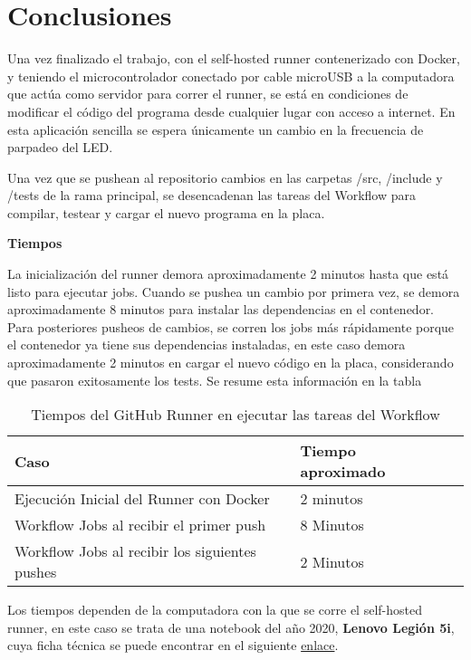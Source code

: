 \chapter{Conclusiones}\label{cap:conclusiones}
Una vez finalizado el trabajo, con el self-hosted runner contenerizado con Docker, y teniendo el microcontrolador conectado por cable microUSB a la computadora que actúa como servidor para correr el runner, se está en condiciones de modificar el código del programa desde cualquier lugar con acceso a internet. En esta aplicación sencilla se espera únicamente un cambio en la frecuencia de parpadeo del LED.

Una vez que se pushean al repositorio cambios en las carpetas /src, /include y /tests de la rama principal, se desencadenan las tareas del Workflow para compilar, testear y cargar el nuevo programa en la placa.

\textbf{Tiempos}

La inicialización del runner demora aproximadamente 2 minutos hasta que está listo para ejecutar jobs.
Cuando se pushea un cambio por primera vez, se demora aproximadamente 8 minutos para instalar las dependencias en el contenedor. Para posteriores pusheos de cambios, se corren los jobs más rápidamente porque el contenedor ya tiene sus dependencias instaladas, en este caso demora aproximadamente 2 minutos en cargar el nuevo código en la placa, considerando que pasaron exitosamente los tests. Se resume esta información en la tabla

\begin{table}[H]
\begin{center}
\begin{tabular}{lll}
\hline
\multicolumn{1}{|l|}{\textbf{Caso}} & \multicolumn{1}{l|}{\textbf{Tiempo aproximado}} \\ \hline
\multicolumn{1}{|l|}{Ejecución Inicial del Runner con Docker} & \multicolumn{1}{l|}{2 minutos} \\ \hline
\multicolumn{1}{|l|}{Workflow Jobs al recibir el primer push} & \multicolumn{1}{l|}{8 Minutos} \\ \hline
\multicolumn{1}{|l|}{Workflow Jobs al recibir los siguientes pushes} & \multicolumn{1}{l|}{2 Minutos} \\ \hline
\end{tabular}
\caption{Tiempos del GitHub Runner en ejecutar las tareas del Workflow}
\label{tab:multiplicadores-minutos}
\end{center}
\end{table}

Los tiempos dependen de la computadora con la que se corre el self-hosted runner, en este caso se trata de una notebook del año 2020, \textbf{Lenovo Legión 5i}, cuya ficha técnica se puede encontrar en el siguiente \href{https://www.lenovo.com/ar/es/laptops/laptops-legion/legion-5-series/Legion-5i-15/p/88GMY501434}{enlace}.


